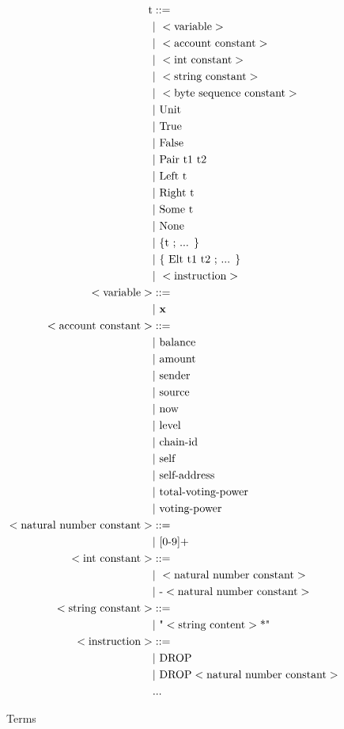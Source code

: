 \documentclass[runningheads]{llncs}
\begin{document}
\pagebreak
\begin{figure}
\begin{align*}
\text{t} &::= \\
   &\text{$\mid$}\ < \text{variable} > \\
   &\text{$\mid$}\ < \text{account constant} > \\
   &\text{$\mid$}\ < \text{int constant} > \\
   &\text{$\mid$}\ < \text{string constant} > \\
   &\text{$\mid$}\ < \text{byte sequence constant} > \\
   &\text{$\mid$}\ \text{Unit} \\
   &\text{$\mid$}\ \text{True} \\
   &\text{$\mid$}\ \text{False} \\
   &\text{$\mid$}\ \text{Pair}\ \text{t1 t2}\\
   &\text{$\mid$}\ \text{Left}\ \text{t}\\
   &\text{$\mid$}\ \text{Right}\ \text{t}\\ 
   &\text{$\mid$}\ \text{Some}\ \text{t}\\
   &\text{$\mid$}\ \text{None} \\
   &\text{$\mid$}\ \text{\{t ; ... \}}\\
   &\text{$\mid$}\ \text{\{ Elt t1 t2 ; ... \}}\\
   &\text{$\mid$}\ <\text{instruction}>   \\
< \text{variable} > &::= \\ 
   &\text{$\mid$}\ \textbf{x}\\
< \text{account constant} > &::= \\ 
   &\text{$\mid$}\ \text{balance} \\
   &\text{$\mid$}\ \text{amount} \\
   &\text{$\mid$}\ \text{sender} \\
   &\text{$\mid$}\ \text{source} \\
   &\text{$\mid$}\ \text{now} \\
   &\text{$\mid$}\ \text{level} \\
   &\text{$\mid$}\ \text{chain-id} \\
   &\text{$\mid$}\ \text{self}  \\
   &\text{$\mid$}\ \text{self-address}  \\
   &\text{$\mid$}\ \text{total-voting-power}  \\
   &\text{$\mid$}\ \text{voting-power}  \\
< \text{natural number constant} > &::= \\ 
   &\text{$\mid$}\ \text {[0-9]+} \\
< \text{int constant} > &::= \\
  &\text{$\mid$}\ < \text{natural number constant} > \\
  &\text{$\mid$}\ \text{-} < \text{natural number constant} > \\
<\text{string constant}> &::= \\
  &\text{$\mid$}\ \text{"} < \text{string content}>\text{*"} \\
<\text{instruction}> &::= \\
  &\text{$\mid$}\ \text{DROP} \\
  &\text{$\mid$}\ \text{DROP} <\text{natural number constant}> \\
  &\text{...}
\end{align*}
\caption{Terms}
\label{fig:term}
\end{figure}
\end{document}
